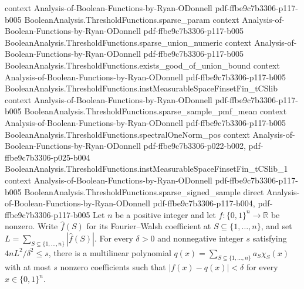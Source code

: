 \begin{theorem}
  {context}
  {Analysis-of-Boolean-Functions-by-Ryan-ODonnell}
  {pdf-ffbe9c7b3306-p117-b005}
\proofstep
  {BooleanAnalysis.ThresholdFunctions.sparse_param}
  {context}
  {Analysis-of-Boolean-Functions-by-Ryan-ODonnell}
  {pdf-ffbe9c7b3306-p117-b005}
\proofstep
  {BooleanAnalysis.ThresholdFunctions.sparse_union_numeric}
  {context}
  {Analysis-of-Boolean-Functions-by-Ryan-ODonnell}
  {pdf-ffbe9c7b3306-p117-b005}
\proofstep
  {BooleanAnalysis.ThresholdFunctions.exists_good_of_union_bound}
  {context}
  {Analysis-of-Boolean-Functions-by-Ryan-ODonnell}
  {pdf-ffbe9c7b3306-p117-b005}
\proofstep
  {BooleanAnalysis.ThresholdFunctions.instMeasurableSpaceFinsetFin_tCSlib}
  {context}
  {Analysis-of-Boolean-Functions-by-Ryan-ODonnell}
  {pdf-ffbe9c7b3306-p117-b005}
\proofstep
  {BooleanAnalysis.ThresholdFunctions.sparse_sample_pmf_mean}
  {context}
  {Analysis-of-Boolean-Functions-by-Ryan-ODonnell}
  {pdf-ffbe9c7b3306-p117-b005}
\proofstep
  {BooleanAnalysis.ThresholdFunctions.spectralOneNorm_pos}
  {context}
  {Analysis-of-Boolean-Functions-by-Ryan-ODonnell}
  {pdf-ffbe9c7b3306-p022-b002,
    pdf-ffbe9c7b3306-p025-b004}
\proofstep
  {BooleanAnalysis.ThresholdFunctions.instMeasurableSpaceFinsetFin_tCSlib_1}
  {context}
  {Analysis-of-Boolean-Functions-by-Ryan-ODonnell}
  {pdf-ffbe9c7b3306-p117-b005}
\proofstep
  {BooleanAnalysis.ThresholdFunctions.sparse_signed_sample}
  {direct}
  {Analysis-of-Boolean-Functions-by-Ryan-ODonnell}
  {pdf-ffbe9c7b3306-p117-b004,
    pdf-ffbe9c7b3306-p117-b005}
Let $n$ be a positive integer and let $f:\{0,1\}^n\to\mathbb R$ be nonzero. Write
$\widehat f(S)$ for its Fourier–Walsh coefficient at $S\subseteq\{1,\ldots,n\}$, and set
$L=\sum_{S\subseteq\{1,\ldots,n\}}|\widehat f(S)|$. For every $\delta>0$ and nonnegative
integer $s$ satisfying $4nL^2/\delta^2\le s$, there is a multilinear polynomial
$q(x)=\sum_{S\subseteq\{1,\ldots,n\}}a_S\chi_S(x)$ with at most $s$ nonzero coefficients
such that $|f(x)-q(x)|<\delta$ for every $x\in\{0,1\}^n$.
\end{theorem}

